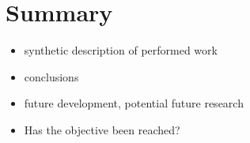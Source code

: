 \documentclass[a4paper,twoside,12pt]{book}
\begin{document}
%
%


\chapter{Summary}


\begin{itemize}
\item synthetic description of performed work
\item conclusions
\item  future development, potential future research
\item Has the objective been reached?
\end{itemize}
\end{document}
